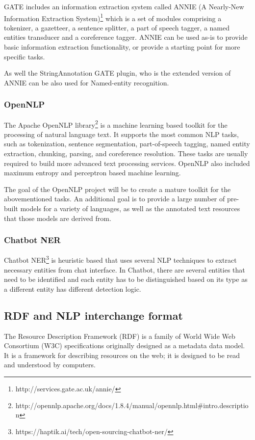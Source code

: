 \documentclass[thesis=M,english]{FITthesis}[2018/05/30]
\begin{document}
GATE includes an information extraction system called ANNIE (A Nearly-New Information Extraction System)\footnote{http://services.gate.ac.uk/annie/} which is a set of modules comprising a tokenizer, a gazetteer, a sentence splitter, a part of speech tagger, a named entities transducer and a coreference tagger. ANNIE can be used as-is to provide basic information extraction functionality, or provide a starting point for more specific tasks.

As well the StringAnnotation GATE plugin, who is the extended version of ANNIE can be also used for Named-entity recognition.

\subsubsection{OpenNLP}\label{OpenNLP}
The Apache OpenNLP library\footnote{http://opennlp.apache.org/docs/1.8.4/manual/opennlp.html\#intro.description} is a machine learning based toolkit for the processing of natural language text. It supports the most common NLP tasks, such as tokenization, sentence segmentation, part-of-speech tagging, named entity extraction, chunking, parsing, and coreference resolution. These tasks are usually required to build more advanced text processing services. OpenNLP also included maximum entropy and perceptron based machine learning.

The goal of the OpenNLP project will be to create a mature toolkit for the abovementioned tasks. An additional goal is to provide a large number of pre-built models for a variety of languages, as well as the annotated text resources that those models are derived from.

\subsubsection{Chatbot NER}\label{Chatbot NER}
Chatbot NER\footnote{https://haptik.ai/tech/open-sourcing-chatbot-ner/} is heuristic based that uses several NLP techniques to extract necessary entities from chat interface. In Chatbot, there are several entities that need to be identified and each entity has to be distinguished based on its type as a different entity has different detection logic. 



\subsection{RDF and NLP interchange format}
	The Resource Description Framework (RDF)\cite{wiki:RDF} is a family of World Wide Web Consortium (W3C) specifications originally designed as a metadata data model.  It is a framework for describing resources on the web; it is designed to be read and understood by computers.
	
\end{document}
